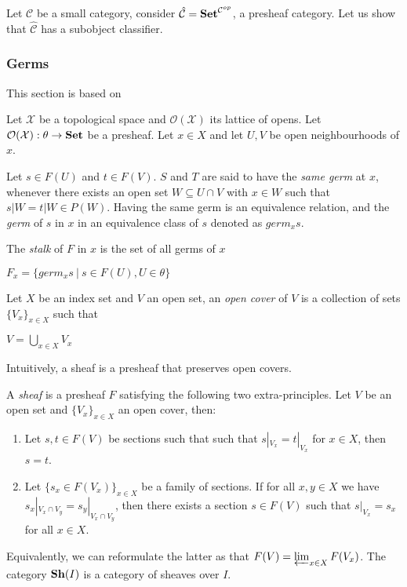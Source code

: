 \documentclass[a4paper]{article}
\theoremstyle{defin}
\theoremstyle{theorem}
\theoremstyle{claim}
\theoremstyle{prop}
\theoremstyle{lemma}
\theoremstyle{fact}
\theoremstyle{ex}
\theoremstyle{col}
\begin{document}
Let $\mathcal{C}$ be a small category, consider $\hat{\mathcal{C}} = {\bf Set}^{\mathcal{C}^{op}}$, a presheaf category. Let us show that $\hat{\mathcal{C}}$ has a subobject classifier.

\subsubsection{Germs}

This section is based on \cite[Chapter II, paragraph 5]{maclane2012sheaves}

Let $\mathcal{X}$ be a topological space and $\mathcal{O}(\mathcal{X})$ its lattice of opens. Let $\mathcal{O}(\mathcal{X}) : \theta \to {\bf Set}$ be a presheaf. Let $x \in X$ and let $U, V$ be open neighbourhoods of $x$.

Let $s \in F(U)$ and $t \in F(V)$. $S$ and $T$ are said to have the \emph{same germ} at $x$, whenever there exists an open set $W \subseteq U \cap V$ with $x \in W$ such that $s|W = t|W \in P(W)$. Having the same germ is an equivalence relation, and the \emph{germ} of $s$ in $x$ in an equivalence class of $s$ denoted as $germ_x s$.

The \emph{stalk} of $F$ in $x$ is the set of all germs of $x$
\begin{center}
$F_x = \{ germ_x s \: | \: s \in F(U), U \in \theta \}$
\end{center}

Let $X$ be an index set and $V$ an open set, an \emph{open cover} of $V$ is a collection of sets $\{ V_x\}_{x \in X}$ such that
\begin{center}
$V = \bigcup \limits_{x \in X} V_x$
\end{center}

Intuitively, a sheaf is a presheaf that preserves open covers.

A \emph{sheaf} is a presheaf $F$ satisfying the following two extra-principles. Let $V$ be an open set and $\{V_x
\}_{x \in X}$ an open cover, then:
\begin{enumerate}
\item Let $s, t \in F(V)$ be sections such that such that $s|_{V_x} = t|_{V_x}$ for $x \in X$, then $s = t$.
\item Let $\{ s_x \in F(V_x) \}_{x \in X}$ be a family of sections. If for all $x, y \in X$ we have $s_x|_{V_x \cap V_y} = s_y|_{V_x \cap V_y}$, then there exists a section $s \in F(V)$ such that $s|_{V_x} = s_x$ for all $x \in X$.
\end{enumerate}
Equivalently, we can reformulate the latter as that $F(V) = \varprojlim_{x \in X} F(V_x)$.
The category ${\bf Sh}(I)$ is a category of sheaves over $I$.
\end{document}
